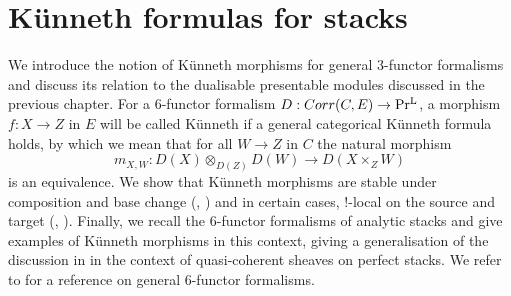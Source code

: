 \section{Künneth formulas for stacks}\label{Künneth formulas for stacks}
We introduce the notion of Künneth morphisms for general $3$-functor formalisms and discuss its relation to the dualisable presentable modules discussed in the previous chapter. For a $6$-functor formalism $D: Corr(C,E)\to \operatorname{Pr^{L}}$, a morphism $f: X \to Z$ in $E$ will be called Künneth if a general categorical Künneth formula holds, by which we mean that for all $W\to Z$ in $C$ the natural morphism
\[
m_{X,W}: D(X) \otimes_{D(Z)} D(W) \to D(X\times_Z W)
\]
is an equivalence. We show that Künneth morphisms are stable under composition and base change (, ) and in certain cases,  $!$-local on the source and target (, ). Finally, we recall the $6$-functor formalisms of analytic stacks and give examples of Künneth morphisms in this context, giving a generalisation of the discussion in \Cite[Chapter 3-4]{ben2010integral} in the context of quasi-coherent sheaves on perfect stacks. We refer to \Cite[Chapter 1-4]{heyer20246} for a reference on general $6$-functor formalisms.
